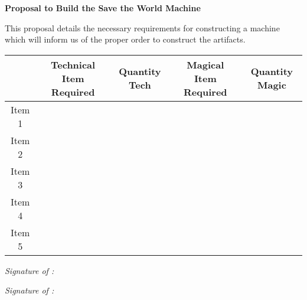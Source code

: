 \documentclass[white]{guildcamp3}
\begin{document}
\name{\wTest{}} %
\large\textbf{Proposal to Build the Save the World Machine}


This proposal details the necessary requirements for constructing a machine which will inform us of the proper order to construct the artifacts. 


\begin{tabular}{|c|c|c|c|c|}
	\hline \rule[-2ex]{0pt}{5.5ex}  & Technical Item Required & Quantity Tech & Magical Item Required & Quantity Magic \\ 
	\hline \rule[-2ex]{0pt}{5.5ex} Item 1 &  &  &  &  \\ 
	\hline \rule[-2ex]{0pt}{5.5ex} Item 2 &  &  &  &  \\ 
	\hline \rule[-2ex]{0pt}{5.5ex} Item 3 &  &  &  &  \\ 
	\hline \rule[-2ex]{0pt}{5.5ex} Item 4 &  &  &  &  \\ 
	\hline \rule[-2ex]{0pt}{5.5ex} Item 5 &  &  &  &  \\ 
	\hline 
\end{tabular} 

\emph{Signature of \cPoliOne{\formal}:}

\emph{Signature of \cNobleOne{\formal}:}
\end{document}

